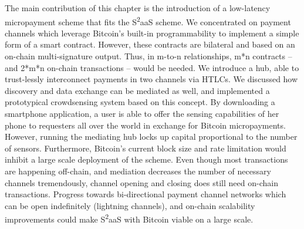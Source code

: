 The main contribution of this chapter is the introduction of a low-latency micropayment scheme that fits the S\textsuperscript{2}aaS scheme. We concentrated on payment channels which leverage Bitcoin's built-in programmability to implement a simple form of a smart contract. However, these contracts are bilateral and based on an on-chain multi-signature output. Thus, in m-to-n relationships, m*n contracts -- and 2*m*n on-chain transactions -- would be needed. We introduce a hub, able to trust-lessly interconnect payments in two channels via \ac{HTLC}s. We discussed how discovery and data exchange can be mediated as well, and implemented a prototypical crowdsensing system based on this concept. By downloading a smartphone application, a user is able to offer the sensing capabilities of her phone to requesters all over the world in exchange for Bitcoin micropayments. However, running the mediating hub locks up capital proportional to the number of sensors. Furthermore, Bitcoin's current block size and rate limitation would inhibit a large scale deployment of the scheme. Even though most transactions are happening off-chain, and mediation decreases the number of necessary channels tremendously, channel opening and closing does still need on-chain transactions. Progress towards bi-directional payment channel networks which can be open indefinitely (lightning channels), and on-chain scalability improvements could make S\textsuperscript{2}aaS with Bitcoin viable on a large scale. 




